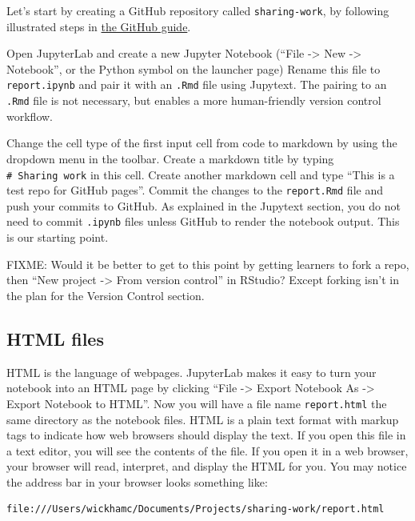 \documentclass[]{Nemilov}
\begin{document}
Let's start by creating a GitHub repository called \texttt{sharing-work},
by following illustrated steps in \href{https://help.github.com/en/articles/create-a-repo}{the GitHub guide}.

Open JupyterLab and create a new Jupyter Notebook
(``File -\textgreater{} New -\textgreater{} Notebook'', or the Python symbol on the launcher page)
Rename this file to \texttt{report.ipynb} and pair it with an \texttt{.Rmd} file using Jupytext.
The pairing to an \texttt{.Rmd} file is not necessary,
but enables a more human-friendly version control workflow.

Change the cell type of the first input cell from code to markdown
by using the dropdown menu in the toolbar.
Create a markdown title by typing \texttt{\#\ Sharing\ work} in this cell.
Create another markdown cell and type ``This is a test repo for GitHub pages''.
Commit the changes to the \texttt{report.Rmd} file and push your commits to GitHub.
As explained in the Jupytext section, you do not need to commit \texttt{.ipynb} files
unless GitHub to render the notebook output.
This is our starting point.

FIXME: Would it be better to get to this point by getting learners to fork a repo,
then ``New project -\textgreater{} From version control'' in RStudio?
Except forking isn't in the plan for the Version Control section.

\hypertarget{html-files}{%
\subsection{HTML files}\label{html-files}}

HTML is the language of webpages.
JupyterLab makes it easy to turn your notebook into an HTML page
by clicking ``File -\textgreater{} Export Notebook As -\textgreater{} Export Notebook to HTML''.
Now you will have a file name \texttt{report.html} the same directory as the notebook files.
HTML is a plain text format with markup tags
to indicate how web browsers should display the text.
If you open this file in a text editor,
you will see the contents of the file.
If you open it in a web browser,
your browser will read, interpret, and display the HTML for you.
You may notice the address bar in your browser looks something like:

\begin{verbatim}
file:///Users/wickhamc/Documents/Projects/sharing-work/report.html
\end{verbatim}
\end{document}
